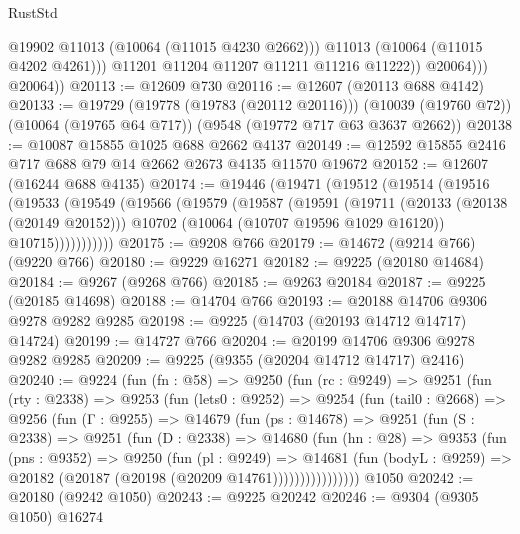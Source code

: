 \begin{lexlean}{RustStd}
\begin{coremodule}
                      @19902
                      @11013
                      (@10064 (@11015 @4230 @2662)))
                    @11013
                    (@10064 (@11015 @4202 @4261)))
                  @11201
                  @11204
                  @11207
                  @11211
                  @11216
                  @11222))
              @20064)))
        @20064))
@20113 := @12609 @730
@20116 := @12607 (@20113 @688 @4142)
@20133 := @19729
    (@19778 (@19783 (@20112 @20116)))
    (@10039 (@19760 @72))
    (@10064 (@19765 @64 @717))
    (@9548 (@19772 @717 @63 @3637 @2662))
@20138 := @10087 @15855 @1025 @688 @2662 @4137
@20149 := @12592 @15855 @2416 @717 @688 @79 @14 @2662 @2673 @4135 @11570 @19672
@20152 := @12607 (@16244 @688 @4135)
@20174 := @19446
    (@19471
      (@19512
        (@19514
          (@19516
            (@19533
              (@19549
                (@19566
                  (@19579
                    (@19587
                      (@19591
                        (@19711
                          (@20133 (@20138 (@20149 @20152)))
                          @10702
                          (@10064 (@10707 @19596 @1029 @16120))
                          @10715)))))))))))
@20175 := @9208 @766
@20179 := @14672 (@9214 @766) (@9220 @766)
@20180 := @9229 @16271
@20182 := @9225 (@20180 @14684)
@20184 := @9267 (@9268 @766)
@20185 := @9263 @20184
@20187 := @9225 (@20185 @14698)
@20188 := @14704 @766
@20193 := @20188 @14706 @9306 @9278 @9282 @9285
@20198 := @9225 (@14703 (@20193 @14712 @14717) @14724)
@20199 := @14727 @766
@20204 := @20199 @14706 @9306 @9278 @9282 @9285
@20209 := @9225 (@9355 (@20204 @14712 @14717) @2416)
@20240 := @9224
    (fun (fn : @58) =>
    @9250
      (fun (rc : @9249) =>
      @9251
        (fun (rty : @2338) =>
        @9253
          (fun (lets0 : @9252) =>
          @9254
            (fun (tail0 : @2668) =>
            @9256
              (fun (Γ : @9255) =>
              @14679
                (fun (ps : @14678) =>
                @9251
                  (fun (S : @2338) =>
                  @9251
                    (fun (D : @2338) =>
                    @14680
                      (fun (hn : @28) =>
                      @9353
                        (fun (pns : @9352) =>
                        @9250
                          (fun (pl : @9249) =>
                          @14681
                            (fun (bodyL : @9259) =>
                            @20182 (@20187 (@20198 (@20209 @14761))))))))))))))))
    @1050
@20242 := @20180 (@9242 @1050)
@20243 := @9225 @20242
@20246 := @9304 (@9305 @1050) @16274

\end{coremodule}
\end{lexlean}
